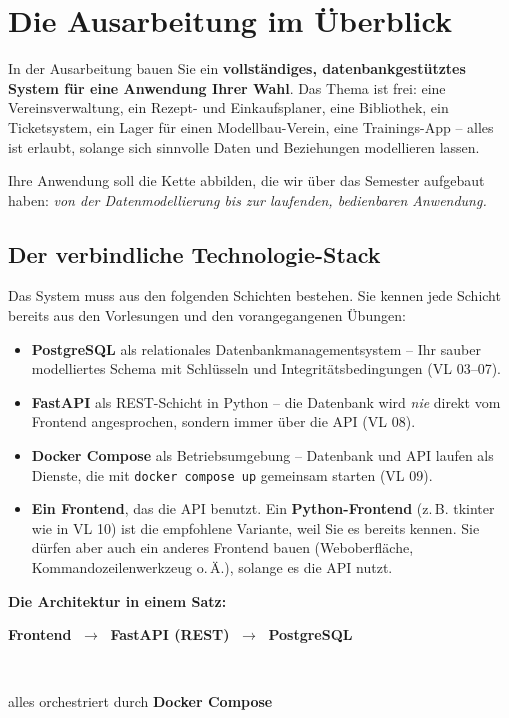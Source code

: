 \documentclass[11pt,a4paper]{article}
\begin{document}
\section{Die Ausarbeitung im Überblick}

In der Ausarbeitung bauen Sie ein \textbf{vollständiges, datenbankgestütztes
System für eine Anwendung Ihrer Wahl}. Das Thema ist frei: eine
Vereinsverwaltung, ein Rezept- und Einkaufsplaner, eine Bibliothek, ein
Ticketsystem, ein Lager für einen Modellbau-Verein, eine Trainings-App --
alles ist erlaubt, solange sich sinnvolle Daten und Beziehungen modellieren
lassen.

Ihre Anwendung soll die Kette abbilden, die wir über das Semester aufgebaut
haben: \emph{von der Datenmodellierung bis zur laufenden, bedienbaren
Anwendung.}

\subsection{Der verbindliche Technologie-Stack}

Das System muss aus den folgenden Schichten bestehen. Sie kennen jede Schicht
bereits aus den Vorlesungen und den vorangegangenen Übungen:

\begin{itemize}[leftmargin=1.4em]
  \item \textbf{PostgreSQL} als relationales Datenbankmanagementsystem
        -- Ihr sauber modelliertes Schema mit Schlüsseln und
        Integritätsbedingungen (VL 03--07).
  \item \textbf{FastAPI} als REST-Schicht in Python -- die Datenbank wird
        \emph{nie} direkt vom Frontend angesprochen, sondern immer über die API
        (VL 08).
  \item \textbf{Docker Compose} als Betriebsumgebung -- Datenbank und API
        laufen als Dienste, die mit \texttt{docker compose up} gemeinsam
        starten (VL 09).
  \item \textbf{Ein Frontend}, das die API benutzt. Ein \textbf{Python-Frontend}
        (z.\,B. tkinter wie in VL 10) ist die empfohlene Variante, weil Sie es
        bereits kennen. Sie dürfen aber auch ein anderes Frontend bauen
        (Weboberfläche, Kommandozeilenwerkzeug o.\,Ä.), solange es die API
        nutzt.
\end{itemize}

\begin{beispielbox}
\textbf{Die Architektur in einem Satz:}\\[4pt]
\centerline{%
  \textbf{Frontend} $\;\longrightarrow\;$ \textbf{FastAPI (REST)}
  $\;\longrightarrow\;$ \textbf{PostgreSQL}%
}\\[4pt]
\centerline{alles orchestriert durch \textbf{Docker Compose}}
\end{beispielbox}
\end{document}
